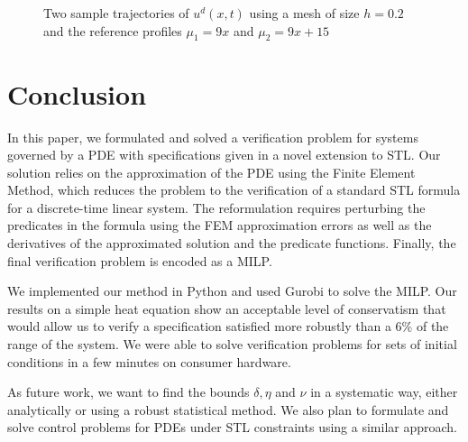 \documentclass[letterpaper, 10 pt, conference]{ieeeconf/ieeeconf}
\begin{document}
\begin{figure}[!t]
    \centering 
        \hfill
        \hfill
        \caption{Two sample trajectories of $u^d(x, t)$ using a mesh of size
        $h=0.2$ and the reference profiles $\mu_1 = 9x$ and $\mu_2 = 9x + 15$}
    \label{fig:mech_evolution}
\end{figure}


\section{Conclusion}
\label{sec:conclusion}

In this paper, we formulated and solved a verification problem for systems governed by a
PDE with specifications given in a novel extension to STL. Our solution relies
on the approximation of the PDE using the Finite Element Method, which reduces
the problem to the verification of a standard STL formula for a discrete-time
linear system. The reformulation requires perturbing the predicates in the
formula using the FEM approximation errors as well as the derivatives of the
approximated solution and the predicate functions. Finally, the final
verification problem is encoded as a MILP.

We implemented our method in Python and used Gurobi to solve the MILP. Our
results on a simple heat equation show an acceptable level of conservatism that
would allow us to verify a specification satisfied more robustly than a 6\% of the range of
the system. We were able to solve verification problems for sets of initial conditions in a
few minutes on consumer hardware.

As future work, we want to find the bounds $\delta, \eta$ and $\nu$ in a
systematic way, either analytically or using a robust statistical method. We
also plan to formulate and solve control problems for PDEs under STL constraints
using a similar approach.



\end{document}
